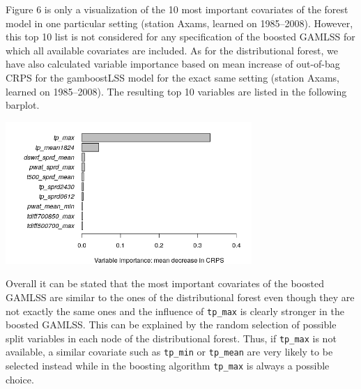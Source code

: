 \documentclass[american,foldmarks=false,noconfig]{uibklttr}
\begin{document}
Figure 6 is only a visualization of the 10 most important covariates 
of the forest model in one particular setting (station Axams, learned 
on 1985--2008). However, this top 10 list is not considered for any specification 
of the boosted GAMLSS for which all available covariates are included. As 
for the distributional forest, we have also calculated variable importance 
based on mean increase of out-of-bag CRPS for the gamboostLSS model for 
the exact same setting (station Axams, learned on 1985--2008). The resulting 
top 10 variables are listed in the following barplot.

\begin{center}
\includegraphics[width = 0.7\textwidth]{varimp_gb.jpeg}
\end{center}

Overall it can be stated that the most important covariates of the boosted 
GAMLSS are similar to the ones of the distributional forest even though they
are not exactly the same ones and the influence of \texttt{tp\_max} is clearly
stronger in the boosted GAMLSS. This can be explained by the random selection
of possible split variables in each node of the distributional forest. Thus,
if \texttt{tp\_max} is not available, a similar covariate such as \texttt{tp\_min}
or \texttt{tp\_mean} are very likely to be selected instead while in the boosting
algorithm \texttt{tp\_max} is always a possible choice.



\end{document}
